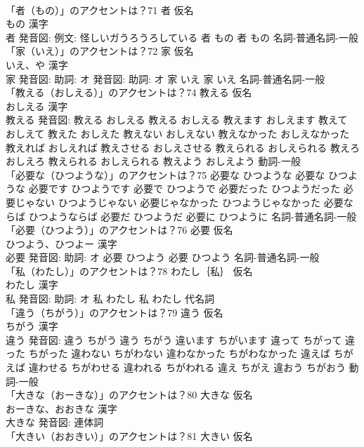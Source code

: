 \documentclass[8pt]{extreport}
\begin{document}
\begin{CJK}{UTF8}{min}
\\	「者（もの）」のアクセントは？71	者 仮名　
\\	もの 漢字　
\\	者 発音図: 例文: 怪しいガうろうろしている	者 もの		者 もの				名詞-普通名詞-一般 
\\	「家（いえ）」のアクセントは？72	家 仮名　
\\	いえ、や 漢字　
\\	家 発音図: 助詞: オ 発音図: 助詞: オ	家 いえ		家 いえ				名詞-普通名詞-一般 
\\	「教える（おしえる）」のアクセントは？74	教える 仮名　
\\	おしえる 漢字　
\\	教える 発音図:	教える おしえる		教える おしえる 教えます おしえます 教えて おしえて 教えた おしえた 教えない おしえない 教えなかった おしえなかった 教えれば おしえれば 教えさせる おしえさせる 教えられる おしえられる 教えろ おしえろ 教えられる おしえられる 教えよう おしえよう				動詞-一般 
\\	「必要な（ひつような）」のアクセントは？75		必要な ひつような		必要な ひつような 必要です ひつようです 必要で ひつようで 必要だった ひつようだった 必要じゃない ひつようじゃない 必要じゃなかった ひつようじゃなかった 必要ならば ひつようならば 必要だ ひつようだ 必要に ひつように				名詞-普通名詞-一般 
\\	「必要（ひつよう）」のアクセントは？76	必要 仮名　
\\	ひつよう、ひつよー 漢字　
\\	必要 発音図: 助詞: オ	必要 ひつよう		必要 ひつよう				名詞-普通名詞-一般 
\\	「私（わたし）」のアクセントは？78	わたし｛私｝ 仮名　
\\	わたし 漢字　
\\	私 発音図: 助詞: オ	私 わたし		私 わたし				代名詞 
\\	「違う（ちがう）」のアクセントは？79	違う 仮名　
\\	ちがう 漢字　
\\	違う 発音図:	違う ちがう		違う ちがう 違います ちがいます 違って ちがって 違った ちがった 違わない ちがわない 違わなかった ちがわなかった 違えば ちがえば 違わせる ちがわせる 違われる ちがわれる 違え ちがえ 違おう ちがおう				動詞-一般 
\\	「大きな（おーきな）」のアクセントは？80	大きな 仮名　
\\	おーきな、おおきな 漢字　
\\	大きな 発音図:							連体詞 
\\	「大きい（おおきい）」のアクセントは？81	大きい 仮名　

\end{CJK}
\end{document}
